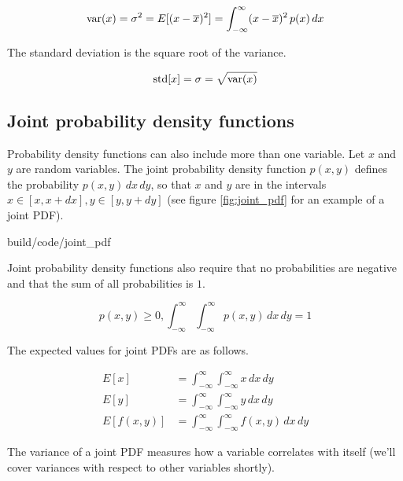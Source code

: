 \begin{equation*}
  \operatorname{var}(x) = \sigma^2 = E[(x - \overline{x})^2] =
    \int_{-\infty}^{\infty} (x - \overline{x})^2 \,p(x) \,dx
\end{equation*}

The standard deviation is the square root of the variance.

\begin{equation*}
  \operatorname{std}[x] = \sigma = \sqrt{\operatorname{var}(x)}
\end{equation*}

\subsection{Joint probability density functions}

Probability density functions can also include more than one variable. Let $x$
and $y$ are random variables. The joint probability density function $p(x, y)$
defines the probability $p(x, y) \,dx \,dy$, so that $x$ and $y$ are in the
intervals $x \in [x, x + dx], y \in [y, y + dy]$ (see figure
\ref{fig:joint_pdf} for an example of a joint PDF).

\begin{svg}{build/code/joint_pdf}
  \caption{Joint probability density function}
  \label{fig:joint_pdf}
\end{svg}

Joint probability density functions also require that no probabilities are
negative and that the sum of all probabilities is $1$.

\begin{equation*}
  p(x, y) \geq 0, \int_{-\infty}^\infty \int_{-\infty}^{\infty} p(x, y) \,dx
    \,dy = 1
\end{equation*}

The expected values for joint PDFs are as follows.

\begin{align*}
  E[x] &= \int_{-\infty}^\infty \int_{-\infty}^{\infty} x \,dx \,dy \\
  E[y] &= \int_{-\infty}^\infty \int_{-\infty}^{\infty} y \,dx \,dy \\
  E[f(x, y)] &= \int_{-\infty}^\infty \int_{-\infty}^{\infty} f(x, y) \,dx \,dy
\end{align*}

The variance of a joint PDF measures how a variable correlates with itself
(we'll cover variances with respect to other variables shortly).

